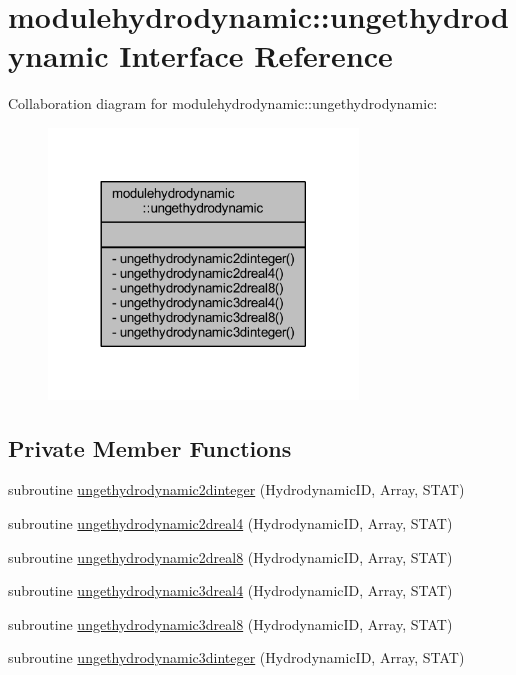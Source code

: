 \hypertarget{interfacemodulehydrodynamic_1_1ungethydrodynamic}{}\section{modulehydrodynamic\+:\+:ungethydrodynamic Interface Reference}
\label{interfacemodulehydrodynamic_1_1ungethydrodynamic}


Collaboration diagram for modulehydrodynamic\+:\+:ungethydrodynamic\+:\nopagebreak
\begin{figure}[H]
\begin{center}
\leavevmode
\includegraphics[width=233pt]{interfacemodulehydrodynamic_1_1ungethydrodynamic__coll__graph}
\end{center}
\end{figure}
\subsection*{Private Member Functions}
\begin{DoxyCompactItemize}
\item 
subroutine \mbox{\hyperlink{interfacemodulehydrodynamic_1_1ungethydrodynamic_a15424adfde86a1a3ea98971ac700c039}{ungethydrodynamic2dinteger}} (Hydrodynamic\+ID, Array, S\+T\+AT)
\item 
subroutine \mbox{\hyperlink{interfacemodulehydrodynamic_1_1ungethydrodynamic_a34666c5d52c52555332ea3ca8f5beda3}{ungethydrodynamic2dreal4}} (Hydrodynamic\+ID, Array, S\+T\+AT)
\item 
subroutine \mbox{\hyperlink{interfacemodulehydrodynamic_1_1ungethydrodynamic_a21ff612d82daa5460e0d92a1e2cf4ac7}{ungethydrodynamic2dreal8}} (Hydrodynamic\+ID, Array, S\+T\+AT)
\item 
subroutine \mbox{\hyperlink{interfacemodulehydrodynamic_1_1ungethydrodynamic_a8fac01b4713e981baed20dfef5137953}{ungethydrodynamic3dreal4}} (Hydrodynamic\+ID, Array, S\+T\+AT)
\item 
subroutine \mbox{\hyperlink{interfacemodulehydrodynamic_1_1ungethydrodynamic_a347de76335b7783f650d0a119056774c}{ungethydrodynamic3dreal8}} (Hydrodynamic\+ID, Array, S\+T\+AT)
\item 
subroutine \mbox{\hyperlink{interfacemodulehydrodynamic_1_1ungethydrodynamic_a921bf9911a0a3c95110658cdd69a2dec}{ungethydrodynamic3dinteger}} (Hydrodynamic\+ID, Array, S\+T\+AT)
\end{DoxyCompactItemize}


